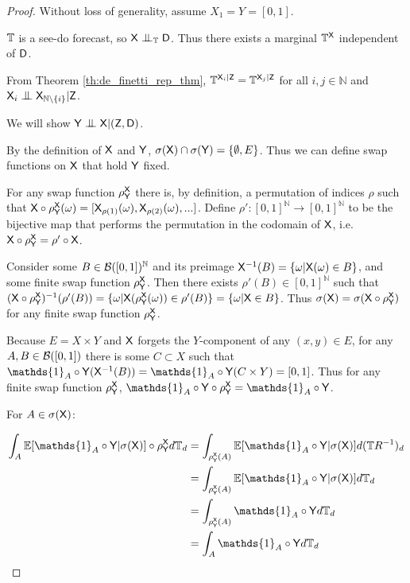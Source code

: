 \begin{proof}
Without loss of generality, assume $X_1=Y=[0,1]$.

$\mathbb{T}$ is a see-do forecast, so $\RV{X}\CI_{\kernel{T}}\RV{D}$. Thus there exists a marginal $\mathbb{T}^{\mathsf{X}}$ independent of $\mathsf{D}$.

From Theorem \ref{th:de_finetti_rep_thm}, $\mathbb{T}^{\mathsf{X}_i|\mathsf{Z}}=\mathbb{T}^{\mathsf{X}_j|\mathsf{Z}}$ for all $i,j\in \mathbb{N}$ and $\RV{X}_i\CI\RV{X}_{\mathbb{N}\setminus\{i\}} |\RV{Z}$.

We will show $\RV{Y}\CI\RV{X}|(\RV{Z},\RV{D})$. 

By the definition of $\mathsf{X}$ and $\mathsf{Y}$, $\sigma(\mathsf{X})\cap\sigma(\mathsf{Y})=\{\emptyset,E\}$. Thus we can define swap functions on $\mathsf{X}$ that hold $\mathsf{Y}$ fixed.

For any swap function $\rho^{\mathsf{X}}_{\mathsf{Y}}$ there is, by definition, a permutation of indices $\rho$ such that $\mathsf{X}\circ\rho^{\mathsf{X}}_{\mathsf{Y}}(\omega) = [\mathsf{X}_{\rho(1)}(\omega),\mathsf{X}_{\rho(2)}(\omega),...]$. Define $\rho':[0,1]^{\mathbb{N}}\to[0,1]^{\mathbb{N}}$ to be the bijective map that performs the permutation in the codomain of $\mathsf{X}$, i.e. $\mathsf{X}\circ\rho^{\mathsf{X}}_{\mathsf{Y}} = \rho'\circ\mathsf{X}$.

Consider some $B\in \mathcal{B}([0,1])^\mathbb{N}$ and its preimage $\mathsf{X}^{-1}(B) = \{\omega|\mathsf{X}(\omega)\in B\}$, and some finite swap function $\rho^{\mathsf{X}}_{\mathsf{Y}}$. Then there exists $\rho'(B)\in [0,1]^{\mathbb{N}}$ such that $(\mathsf{X}\circ\rho^{\mathsf{X}}_{\mathsf{Y}})^{-1}(\rho'(B)) = \{\omega|\mathsf{X}(\rho^{\mathsf{X}}_{\mathsf{Y}}(\omega))\in \rho'(B)\} = \{\omega|\mathsf{X}\in B\}$. Thus $\sigma(\mathsf{X})=\sigma(\mathsf{X}\circ\rho^{\mathsf{X}}_{\mathsf{Y}})$ for any finite swap function $\rho^{\mathsf{X}}_{\mathsf{Y}}$.

Because $E=X\times Y$ and $\mathsf{X}$ forgets the $Y$-component of any $(x,y)\in E$, for any $A,B\in\mathcal{B}([0,1])$ there is some $C\subset X$ such that $\mathds{1}_{A}\circ\RV{Y}(\RV{X}^{-1}(B)) = \mathds{1}_{A}\circ\RV{Y} (C\times Y) = [0,1]$. Thus for any finite swap function $\rho^{\mathsf{X}}_{\mathsf{Y}}$, $\mathds{1}_{A}\circ\RV{Y}\circ \rho^{\RV{X}}_{\RV{Y}} = \mathds{1}_{A}\circ\RV{Y}$.

For $A\in \sigma(\mathsf{X})$:

\begin{align}
    \int_{A} \mathbb{E}[\mathds{1}_A\circ\RV{Y}|\sigma(\RV{X})] \circ\rho^{\RV{X}}_{\RV{Y}} d\kernel{T}_d &= \int_{\rho^{\RV{X}}_{\RV{Y}}(A)} \mathbb{E}[\mathds{1}_A\circ\RV{Y}|\sigma(\RV{X})] d(\kernel{T}R^{-1})_d\\
                                                                         &= \int_{\rho^{\RV{X}}_{\RV{Y}}(A)} \mathbb{E}[\mathds{1}_A\circ\RV{Y}|\sigma(\RV{X})] d\kernel{T}_d \\
                                                                         &= \int_{\rho^{\RV{X}}_{\RV{Y}}(A)} \mathds{1}_A\circ\RV{Y}d\kernel{T}_d\\
                                                                         &= \int_A \mathds{1}_A\circ\RV{Y} d\kernel{T}_d
\end{align}


\end{proof}

